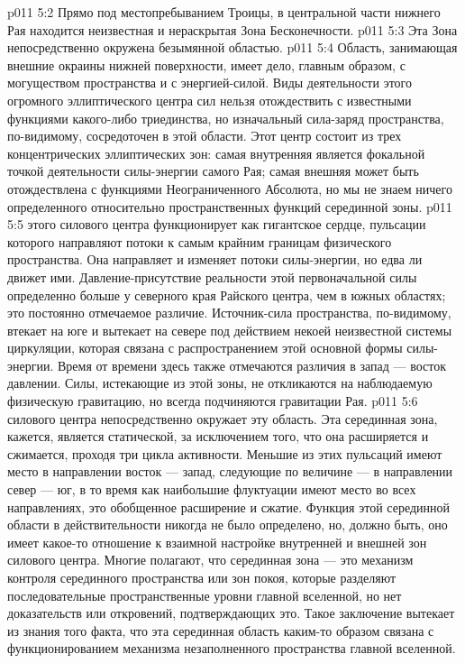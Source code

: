 \vs p011 5:2 \bibnobreakspace Прямо под местопребыванием Троицы, в центральной части нижнего Рая находится неизвестная и нераскрытая Зона Бесконечности.
\vs p011 5:3 \pc {}\bibnobreakspace Эта Зона непосредственно окружена безымянной областью.
\vs p011 5:4 \pc {}\bibnobreakspace Область, занимающая внешние окраины нижней поверхности, имеет дело, главным образом, с могуществом пространства и с энергией\hyp{}силой. Виды деятельности этого огромного эллиптического центра сил нельзя отождествить с известными функциями какого\hyp{}либо триединства, но изначальный сила\hyp{}заряд пространства, по\hyp{}видимому, сосредоточен в этой области. Этот центр состоит из трех концентрических эллиптических зон: самая внутренняя является фокальной точкой деятельности силы\hyp{}энергии самого Рая; самая внешняя может быть отождествлена с функциями Неограниченного Абсолюта, но мы не знаем ничего определенного относительно пространственных функций серединной зоны.
\vs p011 5:5 \pc {} этого силового центра функционирует как гигантское сердце, пульсации которого направляют потоки к самым крайним границам физического пространства. Она направляет и изменяет потоки силы\hyp{}энергии, но едва ли движет ими. Давление\hyp{}присутствие реальности этой первоначальной силы определенно больше у северного края Райского центра, чем в южных областях; это постоянно отмечаемое различие. Источник\hyp{}сила пространства, по\hyp{}видимому, втекает на юге и вытекает на севере под действием некоей неизвестной системы циркуляции, которая связана с распространением этой основной формы силы\hyp{}энергии. Время от времени здесь также отмечаются различия в запад --- восток давлении. Силы, истекающие из этой зоны, не откликаются на наблюдаемую физическую гравитацию, но всегда подчиняются гравитации Рая.
\vs p011 5:6 \pc {} силового центра непосредственно окружает эту область. Эта серединная зона, кажется, является статической, за исключением того, что она расширяется и сжимается, проходя три цикла активности. Меньшие из этих пульсаций имеют место в направлении восток --- запад, следующие по величине --- в направлении север --- юг, в то время как наибольшие флуктуации имеют место во всех направлениях, это обобщенное расширение и сжатие. Функция этой серединной области в действительности никогда не было определено, но, должно быть, оно имеет какое\hyp{}то отношение к взаимной настройке внутренней и внешней зон силового центра. Многие полагают, что серединная зона --- это механизм контроля серединного пространства или зон покоя, которые разделяют последовательные пространственные уровни главной вселенной, но нет доказательств или откровений, подтверждающих это. Такое заключение вытекает из знания того факта, что эта серединная область каким\hyp{}то образом связана с функционированием механизма незаполненного пространства главной вселенной.
